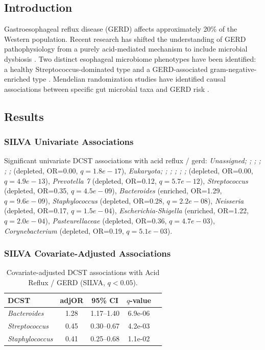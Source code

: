 \documentclass[11pt,a4paper]{article}
\begin{document}
\subsection{Introduction}
Gastroesophageal reflux disease (GERD) affects approximately 20\% of the Western population. Recent research has shifted the understanding of GERD pathophysiology from a purely acid-mediated mechanism to include microbial dysbiosis \cite{DeSouza2021_GERD}. Two distinct esophageal microbiome phenotypes have been identified: a healthy Streptococcus-dominated type and a GERD-associated gram-negative-enriched type \cite{Deshpande2018_esophageal}. Mendelian randomization studies have identified causal associations between specific gut microbial taxa and GERD risk \cite{Wang2024_GERD_MR}.

\subsection{Results}
\subsubsection{SILVA Univariate Associations}
Significant univariate DCST associations with acid reflux / gerd: \textit{Unassigned;  ;  ;  ;  ;  ;  } (depleted, OR=0.00, $q=1.8e-17$), \textit{Eukaryota;  ;  ;  ;  ;  ;  } (depleted, OR=0.00, $q=4.9e-13$), \textit{Prevotella 7} (depleted, OR=0.12, $q=5.7e-12$), \textit{Streptococcus} (depleted, OR=0.35, $q=4.5e-09$), \textit{Bacteroides} (enriched, OR=1.29, $q=9.6e-09$), \textit{Staphylococcus} (depleted, OR=0.28, $q=2.2e-08$), \textit{Neisseria} (depleted, OR=0.17, $q=1.5e-04$), \textit{Escherichia-Shigella} (enriched, OR=1.22, $q=2.0e-04$), \textit{Pasteurellaceae} (depleted, OR=0.36, $q=4.7e-03$), \textit{Corynebacterium} (depleted, OR=0.19, $q=5.1e-03$).

\subsubsection{SILVA Covariate-Adjusted Associations}
\begin{table}[H]\centering\small
\caption{Covariate-adjusted DCST associations with Acid Reflux / GERD (SILVA, $q<0.05$).}\label{tab:Acid_reflux_adj}
\begin{tabular}{lcccc}
\toprule
DCST & adjOR & 95\% CI & $q$-value \\
\midrule
\textit{Bacteroides} & 1.28 & 1.17--1.40 & 6.9e-06 \\
\textit{Streptococcus} & 0.45 & 0.30--0.67 & 4.2e-03 \\
\textit{Staphylococcus} & 0.41 & 0.25--0.68 & 1.1e-02 \\
\bottomrule
\end{tabular}\end{table}
\end{document}
